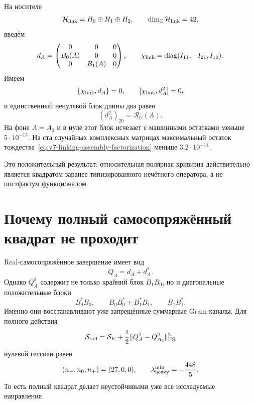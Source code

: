На носителе
\begin{equation}
 \mathcal H_{\rm link}=H_0\oplus H_1\oplus H_2,
 \qquad \dim_{\mathbb C}\mathcal H_{\rm link}=42,
 \label{eq:v7-linking-assembly-carrier}
\end{equation}
введём
\begin{equation}
 d_A=
 \begin{pmatrix}
 0&0&0\\
 B_0(A)&0&0\\
 0&B_1(A)&0
 \end{pmatrix},
 \qquad
 \chi_{\rm link}=\operatorname{diag}(I_{11},-I_{21},I_{10}).
 \label{eq:v7-linking-assembly-differential}
\end{equation}
Имеем
\begin{equation}
 \{\chi_{\rm link},d_A\}=0,
 \qquad
 [\chi_{\rm link},d_A^2]=0,
 \label{eq:v7-linking-assembly-parity}
\end{equation}
и единственный ненулевой блок длины два равен
\begin{equation}
 (d_A^2)_{20}=\mathcal R_U(A).
 \label{eq:v7-linking-assembly-square-block}
\end{equation}
На фоне $A=A_0$ и в нуле этот блок исчезает с машинными остатками меньше
$5\cdot10^{-15}$. На ста случайных комплексных матрицах максимальный
остаток тождества~\eqref{eq:v7-linking-assembly-factorization} меньше
$3.2\cdot10^{-14}$.

Это положительный результат: относительная полярная кривизна действительно
является квадратом заранее типизированного нечётного оператора, а не
постфактум функционалом.

\section{Почему полный самосопряжённый квадрат не проходит}

Real-самосопряжённое завершение имеет вид
\begin{equation}
 Q_A=d_A+d_A^*.
 \label{eq:v7-linking-assembly-selfadjoint-operator}
\end{equation}
Однако $Q_A^2$ содержит не только крайний блок $B_1B_0$, но и диагональные
положительные блоки
\begin{equation}
 B_0^*B_0,\qquad
 B_0B_0^*+B_1^*B_1,\qquad
 B_1B_1^*.
 \label{eq:v7-linking-assembly-diagonal-blocks}
\end{equation}
Именно они восстанавливают уже запрещённые суммарные Gram-каналы.
Для полного действия
\begin{equation}
 \mathcal S_{\rm full}
 =\mathcal S_E+\frac12
 \|Q_A^2-Q_{A_0}^2\|_{\rm HS}^2
 \label{eq:v7-linking-assembly-full-action}
\end{equation}
нулевой гессиан равен
\begin{equation}
 (n_-,n_0,n_+)=(27,0,0),
 \qquad
 \lambda_{\rm heavy}^{\min}=-\frac{448}{5}.
 \label{eq:v7-linking-assembly-full-origin-fail}
\end{equation}
То есть полный квадрат делает неустойчивыми уже все исследуемые направления.

